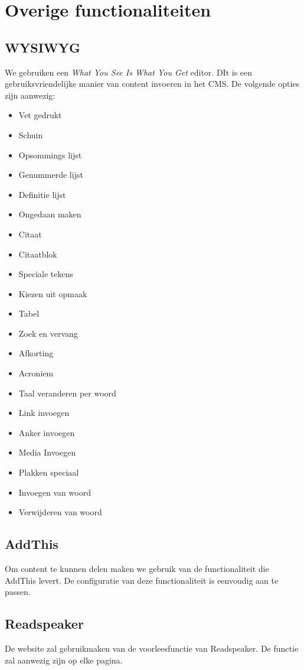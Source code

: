 
\section{Overige functionaliteiten}
\label{sec:overigefunctionaliteiten}

\subsection{WYSIWYG}
We gebruiken een \emph{What You See Is What You Get} editor. DIt is een gebruiksvriendelijke manier van content invoeren in het CMS. De volgende opties zijn aanwezig:

\begin{itemize}
  \item Vet gedrukt
  \item Schuin
  \item Opsommings lijst
  \item Genummerde lijst 
  \item Definitie lijst
  \item Ongedaan maken
  \item Citaat
  \item Citaatblok
  \item Speciale tekens
  \item Kiezen uit opmaak
  \item Tabel
  \item Zoek en vervang
  \item Afkorting
  \item Acroniem
  \item Taal veranderen per woord
  \item Link invoegen
  \item Anker invoegen
  \item Media Invoegen
  \item Plakken speciaal
  \item Invoegen van woord
  \item Verwijderen van woord
\end{itemize}

\subsection{AddThis}
Om content te kunnen delen maken we gebruik van de functionaliteit die AddThis levert. De configuratie van deze functionaliteit is eenvoudig aan te passen.

\subsection{Readspeaker}
De website zal gebruikmaken van de voorleesfunctie van Readspeaker. De functie zal aanwezig zijn op elke pagina.

